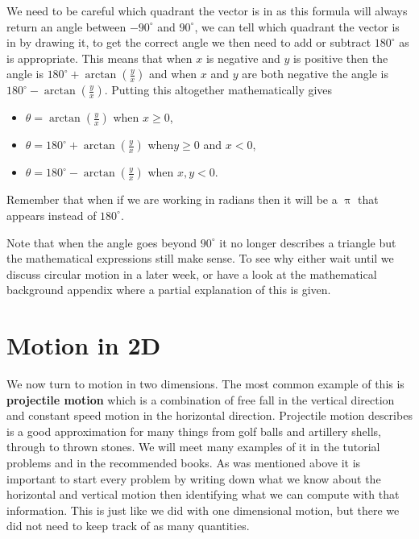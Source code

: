 \documentclass[a4paper,12pt]{book}
\begin{document}
We need to be careful which quadrant the vector is in as this formula will always return an angle between $-90^{\circ}$ and $90^{\circ}$, we can tell which quadrant the vector is in by drawing it, to get the correct angle we then need to add or subtract $180^{\circ}$ as is appropriate. This means that when $x$ is negative and $y$ is positive then the angle is $180^{\circ}+\arctan\left(\frac{y}{x}\right)$ and when $x$ and $y$ are both negative the angle is $180^{\circ}-\arctan\left(\frac{y}{x}\right)$. Putting this altogether mathematically gives
\begin{itemize}
\setlength{\itemsep}{-5pt}
    \item $\theta =\arctan\left(\frac{y}{x}\right) $ when $x\geq 0$,
    \item $\theta =180^{\circ}+\arctan\left(\frac{y}{x}\right) $ when$y\geq 0$ and $x<0$,
    \item $\theta =180^{\circ}-\arctan\left(\frac{y}{x}\right) $ when $x,y <0$.
\end{itemize}
Remember that when if we are working in radians then it will be a $\uppi$ that appears instead of $180^{\circ}$.

Note that when the angle goes beyond $90^{\circ}$ it no longer describes a triangle but the mathematical expressions still make sense. To see why either wait until we discuss circular motion in a later week, or have a look at the mathematical background appendix where a partial explanation of this is given.


\section{Motion in 2D}
We now turn to motion in two dimensions. The most common example of this is \textbf{projectile motion} which is a combination of free fall in the vertical direction and constant speed motion in the horizontal direction.  Projectile motion describes is a good approximation for many things from golf balls and artillery shells, through to thrown stones. We will meet many examples of it in the tutorial problems and in the recommended books. As was mentioned above it is important to start every problem by writing down what we know about the horizontal and vertical motion then identifying what we can compute with that information. This is just like we did with one dimensional motion, but there we did not need to keep track of as many quantities.
\end{document}
